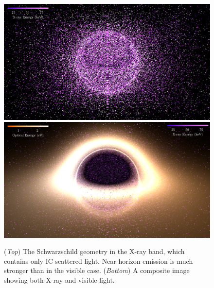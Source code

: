 \documentclass[twocolumn,twocolappendix]{aastex631}
\begin{document}
\begin{figure}
  \centering
  \includegraphics[width=\linewidth]{../imager/small/schwarzschild-xray.pdf}
  \includegraphics[width=\linewidth]{../imager/small/schwarzschild-tog.pdf}
  \caption{(\textit{Top}) The Schwarzschild geometry in the X-ray band, which contains only IC scattered light. Near-horizon emission is much stronger than in the visible case. (\textit{Bottom}) A composite image showing both X-ray and visible light.}
  \label{fig:sch}
\end{figure}
\end{document}
